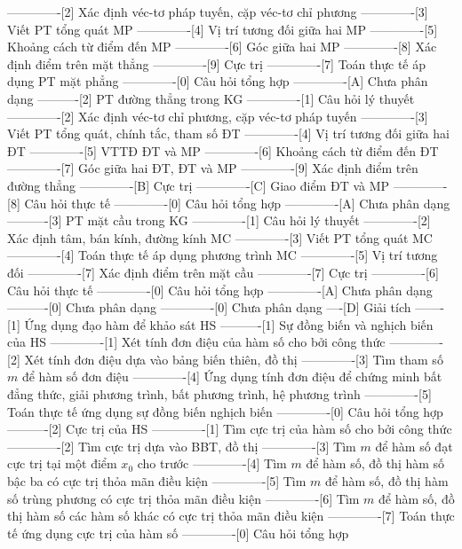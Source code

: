 -------------[2] Xác định véc-tơ pháp tuyến, cặp véc-tơ chỉ phương
-------------[3] Viết PT tổng quát MP
-------------[4] Vị trí tương đối giữa hai MP
-------------[5] Khoảng cách từ điểm đến MP
-------------[6] Góc giữa hai MP
-------------[8] Xác định điểm trên mặt thẳng
-------------[9] Cực trị
-------------[7] Toán thực tế áp dụng PT mặt phẳng
-------------[0] Câu hỏi tổng hợp
-------------[A] Chưa phân dạng
----------[2] PT đường thẳng trong KG
-------------[1] Câu hỏi lý thuyết
-------------[2] Xác định véc-tơ chỉ phương, cặp véc-tơ pháp tuyến
-------------[3] Viết PT tổng quát, chính tắc, tham số ĐT
-------------[4] Vị trí tương đối giữa hai ĐT
-------------[5] VTTĐ ĐT và MP
-------------[6] Khoảng cách từ điểm đến ĐT
-------------[7] Góc giữa hai ĐT, ĐT và MP
-------------[9] Xác định điểm trên đường thẳng
-------------[B] Cực trị
-------------[C] Giao điểm ĐT và MP
-------------[8] Câu hỏi thực tế
-------------[0] Câu hỏi tổng hợp
-------------[A] Chưa phân dạng
----------[3] PT mặt cầu trong KG
-------------[1] Câu hỏi lý thuyết
-------------[2] Xác định tâm, bán kính, đường kính MC
-------------[3] Viết PT tổng quát MC
-------------[4] Toán thực tế áp dụng phương trình MC
-------------[5] Vị trí tương đối
-------------[7] Xác định điểm trên mặt cầu
-------------[7] Cực trị
-------------[6] Câu hỏi thực tế
-------------[0] Câu hỏi tổng hợp
-------------[A] Chưa phân dạng
----------[0] Chưa phân dạng
-------------[0] Chưa phân dạng
----[D] Giải tích
-------[1] Ứng dụng đạo hàm để khảo sát HS
----------[1] Sự đồng biến và nghịch biến của HS
-------------[1] Xét tính đơn điệu của hàm số cho bởi công thức
-------------[2] Xét tính đơn điệu dựa vào bảng biến thiên, đồ thị
-------------[3] Tìm tham số $m$ để hàm số đơn điệu
-------------[4] Ứng dụng tính đơn điệu để chứng minh bất đẳng thức, giải phương trình, bất phương trình, hệ phương trình
-------------[5] Toán thực tế ứng dụng sự đồng biến nghịch biến
-------------[0] Câu hỏi tổng hợp
----------[2] Cực trị của HS
-------------[1] Tìm cực trị của hàm số cho bởi công thức
-------------[2] Tìm cực trị dựa vào BBT, đồ thị
-------------[3] Tìm $m$ để hàm số đạt cực trị tại một điểm $x_0$ cho trước
-------------[4] Tìm $m$ để hàm số, đồ thị hàm số bậc ba có cực trị thỏa mãn điều kiện
-------------[5] Tìm $m$ để hàm số, đồ thị hàm số trùng phương có cực trị thỏa mãn điều kiện
-------------[6] Tìm $m$ để hàm số, đồ thị hàm số các hàm số khác có cực trị thỏa mãn điều kiện
-------------[7] Toán thực tế ứng dụng cực trị của hàm số
-------------[0] Câu hỏi tổng hợp
